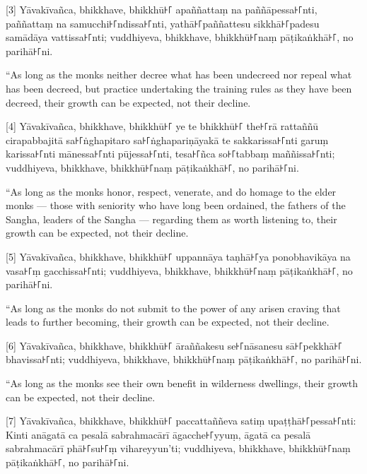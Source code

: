 \documentclass[
  babelLanguage=portuguese,
  final,
  a4Paper,
]{chantingbook}
\begin{document}
[3] Yāvakīvañca, bhikkhave, bhikkhū꜔꜒ apaññattaṃ na paññāpessa꜔꜒nti, paññattaṃ na
samucchi꜔꜒ndissa꜔꜒nti, yathā꜔꜒paññattesu sikkhā꜔꜒padesu samādāya vattissa꜔꜒nti;
vuddhiyeva, bhikkhave, bhikkhū꜔꜒naṃ pāṭikaṅkhā꜔꜒, no parihā꜔꜒ni.

\begin{english}
  “As long as the monks neither decree what has been undecreed nor repeal what
  has been decreed, but practice undertaking the training rules as they have
  been decreed, their growth can be expected, not their decline.
\end{english}

[4] Yāvakīvañca, bhikkhave, bhikkhū꜔꜒ ye te bhikkhū꜔꜒ the꜔꜒rā rattaññū cirapabbajitā
sa꜔꜒ṅghapitaro sa꜔꜒ṅghapariṇāyakā te sakkarissa꜔꜒nti garuṃ karissa꜔꜒nti mānessa꜔꜒nti
pūjessa꜔꜒nti, tesa꜔꜒ñca so꜔꜒tabbaṃ maññissa꜔꜒nti; vuddhiyeva, bhikkhave, bhikkhū꜔꜒naṃ
pāṭikaṅkhā꜔꜒, no parihā꜔꜒ni.

\begin{english}
  “As long as the monks honor, respect, venerate, and do homage to the elder
  monks — those with seniority who have long been ordained, the fathers of the
  Sangha, leaders of the Sangha — regarding them as worth listening to, their
  growth can be expected, not their decline.
\end{english}

[5] Yāvakīvañca, bhikkhave, bhikkhū꜔꜒ uppannāya taṇhā꜔꜒ya ponobhavikāya na vasa꜔꜒ṃ
gacchissa꜔꜒nti; vuddhiyeva, bhikkhave, bhikkhū꜔꜒naṃ pāṭikaṅkhā꜔꜒, no parihā꜔꜒ni.

\begin{english}
  “As long as the monks do not submit to the power of any arisen craving that
  leads to further becoming, their growth can be expected, not their decline.
\end{english}

[6] Yāvakīvañca, bhikkhave, bhikkhū꜔꜒ āraññakesu se꜔꜒nāsanesu sā꜔꜒pekkhā꜔꜒ bhavissa꜔꜒nti;
vuddhiyeva, bhikkhave, bhikkhū꜔꜒naṃ pāṭikaṅkhā꜔꜒, no parihā꜔꜒ni.

\begin{english}
  “As long as the monks see their own benefit in wilderness dwellings, their
  growth can be expected, not their decline.
\end{english}

[7] Yāvakīvañca, bhikkhave, bhikkhū꜔꜒ paccattaññeva satiṃ upaṭṭhā꜔꜒pessa꜔꜒nti: Kinti
anāgatā ca pesalā sabrahmacārī āgacche꜔꜒yyuṃ, āgatā ca pesalā sabrahmacārī phā꜔꜒su꜔꜒ṃ
vihareyyun'ti; vuddhiyeva, bhikkhave, bhikkhū꜔꜒naṃ pāṭikaṅkhā꜔꜒, no parihā꜔꜒ni.
\end{document}

